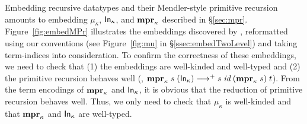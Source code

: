 Embedding recursive datatypes and their Mendler-style primitive recursion
amounts to embedding $\mu_\kappa$, $\mathsf{In}_\kappa$, and $\mathbf{mpr}_\kappa$ described
in \S\ref{sec:mpr}. Figure~\ref{fig:embedMPr} illustrates the embeddings
discovered by \citet{AbeMat04}, reformatted using our conventions (see
Figure~\ref{fig:mu} in \S\ref{ssec:embedTwoLevel}) and taking term-indices
into consideration. To confirm the correctness of these embeddings,
we need to check that (1) the embeddings are well-kinded and well-typed
and (2) the primitive recursion behaves well
(\ie, $\mathbf{mpr}_\kappa\;s\;(\mathsf{In}_\kappa) -->+ s\;\textit{id}\;(\mathbf{mpr}_\kappa\;s)\;t$).
From the term encodings of $\mathbf{mpr}_\kappa$ and $\mathsf{In}_\kappa$, it is obvious that
the reduction of primitive recursion behaves well. Thus, we only need to check
that $\mu_\kappa$ is well-kinded and that $\mathbf{mpr}_\kappa$ and $\mathsf{In}_\kappa$ are
well-typed.
